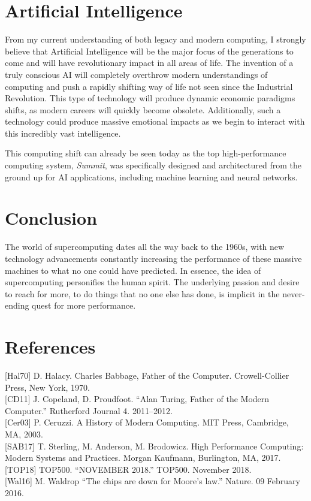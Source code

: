 \documentclass[12pt, letterpaper]{article}
\begin{document}
\section{Artificial Intelligence}

From my current understanding of both legacy and modern computing, I strongly believe that Artificial Intelligence will be the major focus of the generations to come and will have revolutionary impact in all areas of life. The invention of a truly conscious AI will completely overthrow modern understandings of computing and push a rapidly shifting way of life not seen since the Industrial Revolution. This type of technology will produce dynamic economic paradigms shifts, as modern careers will quickly become obsolete. Additionally, such a technology could produce massive emotional impacts as we begin to interact with this incredibly vast intelligence.

This computing shift can already be seen today as the top high-performance computing system, \textit{Summit}, was specifically designed and architectured from the ground up for AI applications, including machine learning and neural networks.

\section{Conclusion}

The world of supercomputing dates all the way back to the 1960s, with new technology advancements constantly increasing the performance of these massive machines to what no one could have predicted. In essence, the idea of supercomputing personifies the human spirit. The underlying passion and desire to reach for more, to do things that no one else has done, is implicit in the never-ending quest for more performance.

\section{References}

\begin{hangparas}{.25in}{1}

[Hal70] D. Halacy. Charles Babbage, Father of the Computer. Crowell-Collier Press, New York, 1970.\\

[CD11] J. Copeland, D. Proudfoot. “Alan Turing, Father of the Modern Computer.” Rutherford Journal 4. 2011–2012.\\

[Cer03] P. Ceruzzi. A History of Modern Computing. MIT Press, Cambridge, MA, 2003.\\

[SAB17] T. Sterling, M. Anderson, M. Brodowicz. High Performance Computing: Modern Systems and Practices. Morgan Kaufmann, Burlington, MA, 2017.\\

[TOP18] TOP500. “NOVEMBER 2018.” TOP500. November 2018.\\

[Wal16] M. Waldrop “The chips are down for Moore’s law.” Nature. 09 February 2016.\\

\end{hangparas}
\end{document}
